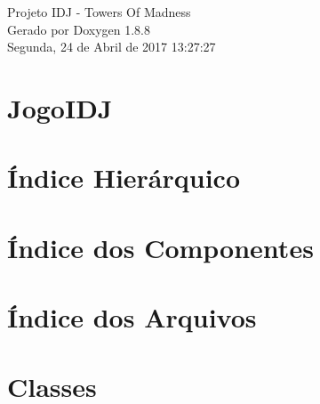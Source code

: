 \documentclass[twoside]{book}
\newcommand{\+}{\discretionary{\mbox{\scriptsize$\hookleftarrow$}}{}{}}
\newcommand{\clearemptydoublepage}{%
  \newpage{\pagestyle{empty}\cleardoublepage}%
}
\begin{document}
\hypersetup{pageanchor=false,
             bookmarks=true,
             bookmarksnumbered=true,
             pdfencoding=unicode
            }
\begin{titlepage}
\vspace*{7cm}
\begin{center}%
{\Large Projeto I\+D\+J -\/ Towers Of Madness }\\
\vspace*{1cm}
{\large Gerado por Doxygen 1.8.8}\\
\vspace*{0.5cm}
{\small Segunda, 24 de Abril de 2017 13:27:27}\\
\end{center}
\end{titlepage}
\clearemptydoublepage
\tableofcontents
\clearemptydoublepage
{}
\hypersetup{pageanchor=true}

\chapter{Jogo\+I\+D\+J}
\label{md_README}
\hypertarget{md_README}{}

\chapter{Índice Hierárquico}

\chapter{Índice dos Componentes}

\chapter{Índice dos Arquivos}

\chapter{Classes}


























\end{document}
